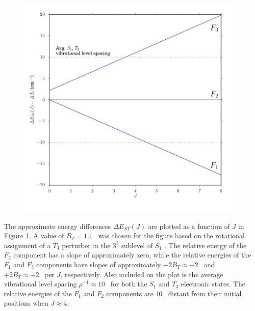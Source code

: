 \documentclass[12pt]{mitthesis}
\begin{document}
\begin{figure}
  \caption{ }
  \label{fig:rotational-energy-differences}
  \centering
  \includegraphics[width=6in]{rotational-energy-differences.pdf}
\end{figure}

The approximate energy differences $\Delta E_{ST}(J)$ are plotted as a
function of $J$ in Figure \ref{fig:rotational-energy-differences}.  A
value of $B_T=1.1$ \rcm\ was chosen for the figure based on the
rotational assignment of a $T_3$ perturber in the $3^3$ 
sublevel of $S_1$ \cite{mishra04}.  The relative energy of the $F_2$
component has a slope of approximately zero, while the relative
energies of the $F_1$ and $F_3$ components have slopes of
approximately $-2B_T \approx -2$ \rcm\ and $+2B_T \approx +2$ \rcm\
per $J$, respectively.  Also included on the plot is the average
vibrational level spacing $\rho^{-1} \approx 10$ \rcm\ for both the
$S_1$ and $T_3$ electronic states.  The relative energies of the $F_1$
and $F_2$ components are 10 \rcm\ distant from their initial positions
when $J \approx 4$.
\end{document}
